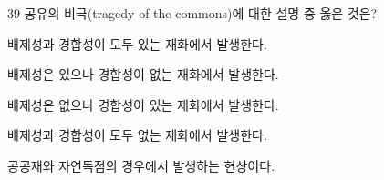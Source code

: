 \begin{question}{39}
공유의 비극(tragedy of the commons)에 대한 설명 중 옳은 것은?
\begin{choices}
  \item 배제성과 경합성이 모두 있는 재화에서 발생한다.
  \item 배제성은 있으나 경합성이 없는 재화에서 발생한다.
  \item 배제성은 없으나 경합성이 있는 재화에서 발생한다.
  \item 배제성과 경합성이 모두 없는 재화에서 발생한다.
  \item 공공재와 자연독점의 경우에서 발생하는 현상이다.
\end{choices}
\end{question}
